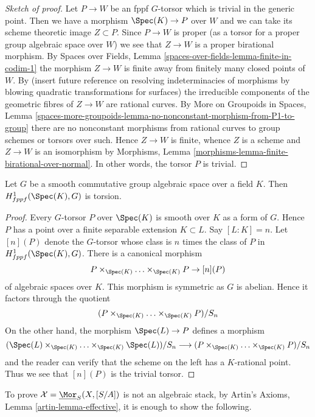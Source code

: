 \begin{proof}[Sketch of proof]
Let $P \to W$ be an fppf $G$-torsor which is trivial in the generic point.
Then we have a morphism $\Spec(K) \to P$ over $W$ and we can take
its scheme theoretic image $Z \subset P$. Since $P \to W$ is proper
(as a torsor for a proper group algebraic space over $W$)
we see that $Z \to W$ is a proper birational morphism.
By Spaces over Fields, Lemma \ref{spaces-over-fields-lemma-finite-in-codim-1}
the morphism $Z \to W$ is finite away from finitely many closed points
of $W$. By (insert future reference on resolving indeterminacies
of morphisms by blowing quadratic transformations for surfaces)
the irreducible components of the geometric fibres of $Z \to W$
are rational curves. By
More on Groupoids in Spaces, Lemma
\ref{spaces-more-groupoids-lemma-no-nonconstant-morphism-from-P1-to-group}
there are no nonconstant morphisms from rational curves
to group schemes or torsors over such.
Hence $Z \to W$ is finite, whence $Z$ is a scheme and $Z \to W$
is an isomorphism by
Morphisms, Lemma \ref{morphisms-lemma-finite-birational-over-normal}.
In other words, the torsor $P$ is trivial.
\end{proof}

\begin{lemma}
\label{lemma-torsors-over-field-torsion}
Let $G$ be a smooth commutative group algebraic space over a field $K$.
Then $H^1_{fppf}(\Spec(K), G)$ is torsion.
\end{lemma}

\begin{proof}
Every $G$-torsor $P$ over $\Spec(K)$ is smooth over $K$ as a form of $G$.
Hence $P$ has a point over a finite separable extension $K \subset L$.
Say $[L : K] = n$. Let $[n](P)$ denote the $G$-torsor whose class is $n$
times the class of $P$ in $H^1_{fppf}(\Spec(K), G)$. There is a canonical
morphism
$$
P \times_{\Spec(K)} \ldots \times_{\Spec(K)} P \to [n](P)
$$
of algebraic spaces over $K$. This morphism is symmetric as
$G$ is abelian. Hence it factors through the quotient
$$
(P \times_{\Spec(K)} \ldots \times_{\Spec(K)} P)/S_n
$$
On the other hand, the morphism $\Spec(L) \to P$ defines a morphism
$$
(\Spec(L) \times_{\Spec(K)} \ldots \times_{\Spec(K)} \Spec(L))/S_n
\longrightarrow (P \times_{\Spec(K)} \ldots \times_{\Spec(K)} P)/S_n
$$
and the reader can verify that the scheme on the left has a $K$-rational
point. Thus we see that $[n](P)$ is the trivial torsor.
\end{proof}

\noindent
To prove $\mathcal{X} = \underline{\Mor}_S(X, [S/A])$
is not an algebraic stack, by
Artin's Axioms, Lemma \ref{artin-lemma-effective},
it is enough to show the following.

